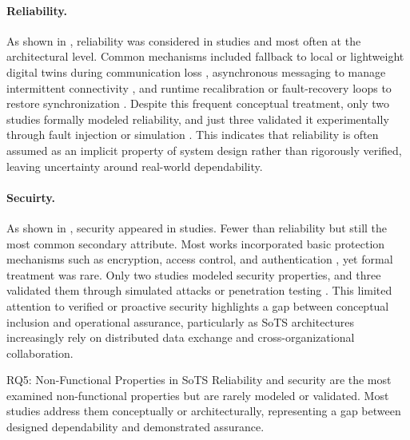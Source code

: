 
\paragraph{Reliability.}
As shown in , reliability was considered in  studies and most often at the architectural level. Common mechanisms included fallback to local or lightweight digital twins during communication loss \cite{alam2017c2ps, larsen2024towards}, asynchronous messaging to manage intermittent connectivity \cite{acharya2023twins, liu2020web-based}, and runtime recalibration or fault-recovery loops to restore synchronization \cite{esterle2021digital, villalonga2021decision-making}.
Despite this frequent conceptual treatment, only two studies formally modeled reliability, and just three validated it experimentally through fault injection or simulation \cite{park2020digital, saraeian2022digital}. This indicates that reliability is often assumed as an implicit property of system design rather than rigorously verified, leaving uncertainty around real-world dependability.


\paragraph{Secuirty.}
As shown in , security appeared in  studies. Fewer than reliability but still the most common secondary attribute. Most works incorporated basic protection mechanisms such as encryption, access control, and authentication \cite{aziz2022empowering, acharya2023twins, dobie2024network}, yet formal treatment was rare.
Only two studies modeled security properties, and three validated them through simulated attacks or penetration testing \cite{malayjerdi2022combined, stary2022privacy}.
This limited attention to verified or proactive security highlights a gap between conceptual inclusion and operational assurance, particularly as SoTS architectures increasingly rely on distributed data exchange and cross-organizational collaboration.

\vspace{1em}
\begin{conclusionframe}{RQ5: Non-Functional Properties in SoTS}
Reliability and security are the most examined non-functional properties but are rarely modeled or validated. Most studies address them conceptually or architecturally, representing a gap between designed dependability and demonstrated assurance.
\end{conclusionframe}


